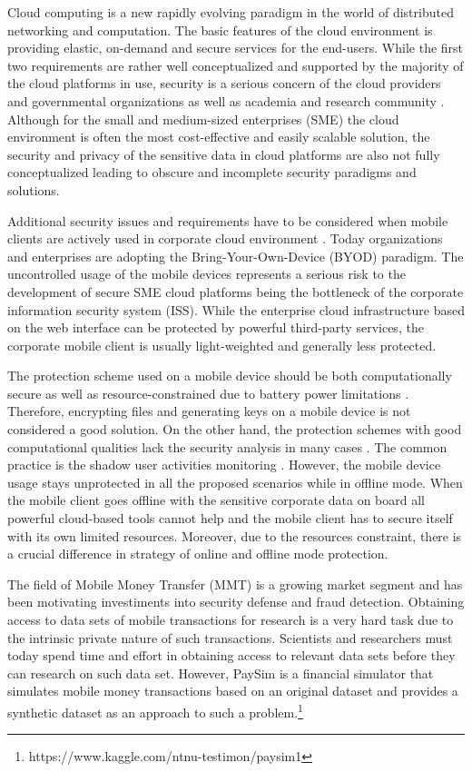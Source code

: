 Cloud computing is a new rapidly evolving paradigm in the world of distributed networking and computation. The basic features of the cloud environment is providing elastic, on-demand and secure services for the end-users. While the first two requirements are rather well conceptualized and supported by the majority of the cloud platforms in use, security is a serious concern of the cloud providers and governmental organizations as well as academia and research community \cite{csa2016,higashi2015,gartner2015}. Although for the small and medium-sized enterprises (SME) the cloud environment is often the most cost-effective and easily scalable solution, the security and privacy of the sensitive data in cloud platforms are also not fully conceptualized leading to obscure and incomplete security paradigms and solutions.

Additional security issues and requirements have to be considered when mobile clients are actively used in corporate cloud environment \cite{yovel2014}. Today organizations and enterprises are adopting the Bring-Your-Own-Device (BYOD) paradigm. The uncontrolled usage of the mobile devices represents a serious risk to the development of secure SME cloud platforms being the bottleneck of the corporate information security system (ISS). While the enterprise cloud infrastructure based on the web interface can be protected by powerful third-party services, the corporate mobile client is usually light-weighted and generally less protected. 

The protection scheme used on a mobile device should be both computationally secure as well as resource-constrained due to battery power limitations \cite{khan2015cloud}. Therefore, encrypting files and generating keys on a mobile device is not considered a good solution. On the other hand, the protection schemes with good computational qualities lack the security analysis in many cases \cite{khan2014bss}. The common practice is the shadow user activities monitoring \cite{yovel2014}. However, the mobile device usage stays unprotected in all the proposed scenarios while in offline mode. When the mobile client goes offline with the sensitive corporate data on board all powerful cloud-based tools cannot help and the mobile client has to secure itself with its own limited resources. Moreover, due to the resources constraint, there is a crucial difference in strategy of online and offline mode protection.

The field of Mobile Money Transfer (MMT) is a growing market segment and has been motivating investiments into security defense and fraud detection. Obtaining access to data sets of mobile transactions for research is a very hard task due to the intrinsic private nature of such transactions. Scientists and researchers must today spend time and effort in obtaining access to relevant data sets before they can research on such data set. However, PaySim is a financial simulator that simulates mobile money transactions based on an original dataset and provides a synthetic dataset as an approach to such a problem.\footnote{https://www.kaggle.com/ntnu-testimon/paysim1}

